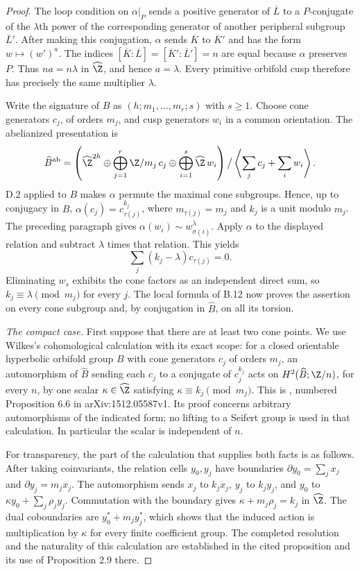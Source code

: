 \begin{proof}
The loop condition on $\alpha|_P$ sends a positive generator of
$\overline L$ to a $P$-conjugate of the $\lambda$th power of the
corresponding generator of another peripheral subgroup $\overline L'$.
After making this conjugation, $\alpha$ sends $\overline K$ to
$\overline K'$ and has the form $w\mapsto(w')^a$.
The indices
$[\overline K:\overline L]=[\overline K':\overline L']=n$
are equal because $\alpha$ preserves $P$.  Thus $na=n\lambda$ in
$\widehat\Z$, and hence $a=\lambda$.  Every primitive orbifold cusp
therefore has precisely the same multiplier $\lambda$.

Write the signature of $B$ as $(h;m_1,\ldots,m_r;s)$ with $s\geq1$.
Choose cone generators $c_j$, of orders $m_j$, and cusp generators $w_i$
in a common orientation.  The abelianized presentation is
\[
 \widehat B^{\mathrm{ab}}
 =\left(\widehat\Z^{2h}\oplus
       \bigoplus_{j=1}^r\Z/m_j\,c_j\oplus
       \bigoplus_{i=1}^s\widehat\Z\,w_i\right)
       \big/\left\langle\sum_jc_j+\sum_iw_i\right\rangle.
\]
D.2 applied to $B$ makes $\alpha$ permute the maximal cone subgroups.
Hence, up to conjugacy in $\widehat B$,
$\alpha(c_j)=c_{\tau(j)}^{k_j}$, where
$m_{\tau(j)}=m_j$ and $k_j$ is a unit modulo $m_j$.
The preceding paragraph gives
$\alpha(w_i)\sim w_{\sigma(i)}^\lambda$.
Apply $\alpha$ to the displayed relation and subtract $\lambda$ times
that relation.  This yields
\[
 \sum_j(k_j-\lambda)c_{\tau(j)}=0.
\]
Eliminating $w_s$ exhibits the cone factors as an independent direct sum,
so $k_j\equiv\lambda\pmod{m_j}$ for every $j$.
The local formula of B.12 now proves the assertion on every cone
subgroup and, by conjugation in $\widehat B$, on all its torsion.

\emph{The compact case.}
First suppose that there are at least two cone points.  We use Wilkes's
cohomological calculation with its exact scope:
for a closed orientable hyperbolic orbifold group $B$ with cone
generators $c_j$ of orders $m_j$, an automorphism of $\widehat B$
sending each $c_j$ to a conjugate of $c_j^{k_j}$ acts on
$H^2(\widehat B;\Z/n)$, for every $n$, by one scalar
$\kappa\in\widehat\Z$ satisfying
$\kappa\equiv k_j\pmod{m_j}$.
This is \cite[Proposition 5.7]{bWilkes2017Seifert}, numbered Proposition
6.6 in arXiv:1512.05587v1.  Its proof concerns arbitrary automorphisms
of the indicated form; no lifting to a Seifert group is used in that
calculation.  In particular the scalar is independent of $n$.

For transparency, the part of the calculation that supplies both facts
is as follows.  After taking coinvariants, the relation cells $y_0,y_j$
have boundaries
$\partial y_0=\sum_jx_j$ and $\partial y_j=m_jx_j$.
The automorphism sends $x_j$ to $k_jx_j$, $y_j$ to $k_jy_j$, and
$y_0$ to $\kappa y_0+\sum_j\rho_jy_j$.
Commutation with the boundary gives
$\kappa+m_j\rho_j=k_j$ in $\widehat\Z$.
The dual coboundaries are $y_0^*+m_jy_j^*$, which shows that the
induced action is multiplication by $\kappa$ for every finite
coefficient group.  The completed resolution and the naturality of this
calculation are established in the cited proposition and its use of
Proposition 2.9 there.


\end{proof}
